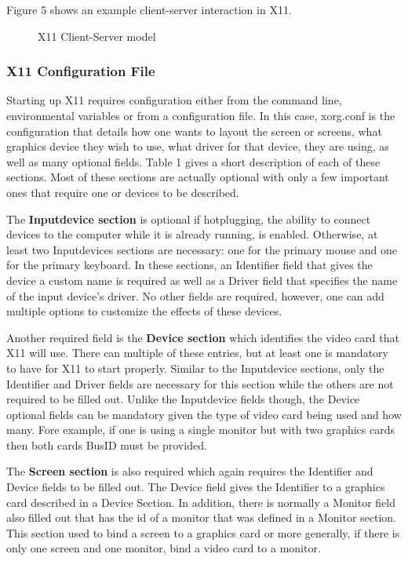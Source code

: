 \documentclass{acm_proc_article-sp}
\begin{document}
Figure 5 shows an example client-server interaction in X11. 
 \begin{figure}[h]
 \centering
 \caption{X11 Client-Server model}
 \end{figure}

\subsubsection{X11 Configuration File}
Starting up X11 requires configuration either from the command line, environmental variables or from a configuration file. In this case, xorg.conf is the configuration that details how one wants to layout the screen or screens, what graphics device they wish to use, what driver for that device, they are using, as well as many optional fields. Table 1 gives a short description of each of these sections. Most of these sections are actually optional with only a few important ones that require one or devices to be described. 
\par
The \textbf{Inputdevice section} is optional if hotplugging, the ability to connect devices to the computer while it is already running, is enabled. Otherwise, at least two Inputdevices sections are necessary: one for the primary mouse and one for the primary keyboard. In these sections, an Identifier field that gives the device a custom name is required as well as a Driver field that specifies the name of the input device's driver. No other fields are required, however, one can add multiple options to customize the effects of these devices. 
\par
Another required field is the \textbf{Device section} which identifies the video card that X11 will use. There can multiple of these entries, but at least one is mandatory to have for X11 to start properly. Similar to the Inputdevice sections, only the Identifier and Driver fields are necessary for this section while the others are not required to be filled out. Unlike the Inputdevice fields though, the Device optional fields can be mandatory given the type of video card being used and how many. Fore example, if one is using a single monitor but with two graphics cards then both cards BusID must be provided. 
\par
The \textbf{Screen section} is also required which again requires the Identifier and Device fields to be filled out. The Device field gives the Identifier to a graphics card described in a Device Section. In addition, there is normally a Monitor field also filled out that has the id of a monitor that was defined in a Monitor section. This section used to bind a screen to a graphics card or more generally, if there is only one screen and one monitor, bind a video card to a monitor.  
\end{document}
